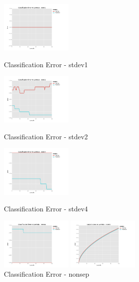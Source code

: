 \documentclass[10pt]{article}
\begin{document}
\begin{figure}[ht]
	\centering
	\begin{minipage}[b]{.24\linewidth}
		\includegraphics[width=1\linewidth, height=1in]{CErr_lambda_stdev1.png}
		\caption*{Classification Error - stdev1}
	\end{minipage}
	\begin{minipage}[b]{.24\linewidth}
		\includegraphics[width=1\linewidth, height=1in]{CErr_lambda_stdev2.png}
		\caption*{Classification Error - stdev2}
	\end{minipage}
	\begin{minipage}[b]{.24\linewidth}
		\includegraphics[width=1\linewidth, height=1in]{CErr_lambda_stdev4.png}
		\caption*{Classification Error - stdev4}
	\end{minipage}
	\begin{minipage}[b]{.24\linewidth}
		\includegraphics[width=1\linewidth, height=1in]{CErr_lambda_nonsep.png}
		\caption*{Classification Error - nonsep}
	\end{minipage}
		\begin{minipage}[b]{.24\linewidth}
		\includegraphics[width=1\linewidth, height=1in]{Loss_lambda_stdev1.png}

\end{minipage}
\end{figure}
\end{document}
